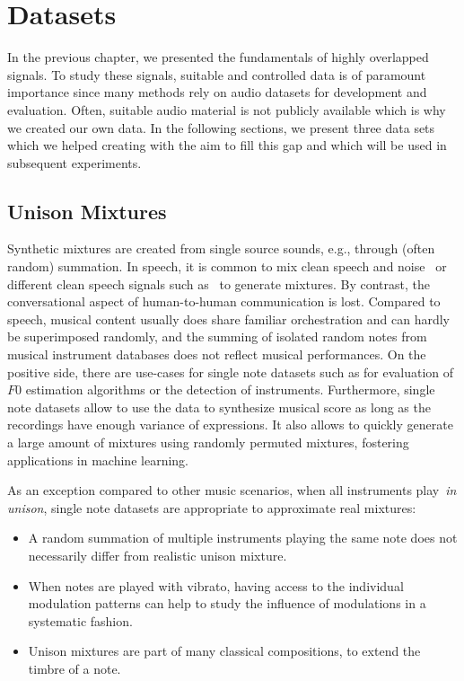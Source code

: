 \chapter{Datasets}
\label{cha:datasets}

In the previous chapter, we presented the fundamentals of highly overlapped signals.
To study these signals, suitable and controlled data is of paramount importance since many methods rely on audio datasets for development and evaluation.
Often, suitable audio material is not publicly available which is why we created our own data.
In the following sections, we present three data sets which we helped creating with the aim to fill this gap and which will be used in subsequent experiments.

\section{Unison Mixtures}
\label{sec:unison_dataset}


Synthetic mixtures are created from single source sounds, e.g., through (often random) summation. 
In speech, it is common to mix clean speech and noise~\cite{varga93} or different clean speech signals such as~\cite{garofolo93} to generate mixtures.
By contrast, the conversational aspect of human-to-human communication is lost.
Compared to speech, musical content usually does share familiar orchestration and can hardly be superimposed randomly, and the summing of isolated random notes from musical instrument databases does not reflect musical performances.
On the positive side, there are use-cases for single note datasets such as for evaluation of \(F0\) estimation algorithms or the detection of instruments.
Furthermore, single note datasets allow to use the data to synthesize musical score as long as the recordings have enough variance of expressions.
It also allows to quickly generate a large amount of mixtures using randomly permuted mixtures, fostering applications in machine learning.

As an exception compared to other music scenarios, when all instruments play~\emph{in unison}, single note datasets are appropriate to approximate real mixtures:

\begin{itemize}
  \item A random summation of multiple instruments playing the same note does not necessarily differ from realistic unison mixture.
  \item When notes are played with vibrato, having access to the individual modulation patterns can help to study the influence of modulations in a systematic fashion.
  \item Unison mixtures are part of many classical compositions, to extend the timbre of a note.
\end{itemize}

